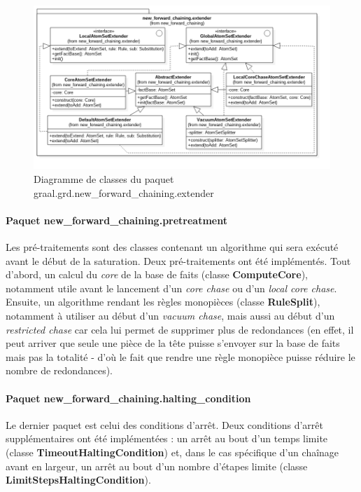        \begin{figure}[h]
        \centering
        \includegraphics[width=\textwidth]{pictures/new_forward_chaining-extender.png}
        \vspace{-30pt}
        \caption{Diagramme de classes du paquet graal.grd.new\_forward\_chaining.extender}
        \label{fig:new_forward_chaining.extender}
        \end{figure}
       
       \paragraph{Paquet new\_forward\_chaining.pretreatment} Les pré-traitements sont des classes contenant un algorithme qui sera exécuté avant le début de la saturation. Deux pré-traitements ont été implémentés. Tout d'abord, un calcul du \textit{core} de la base de faits (classe \textbf{ComputeCore}), notamment utile avant le lancement d'un \textit{core chase} ou d'un \textit{local core chase}. Ensuite, un algorithme rendant les règles monopièces (classe \textbf{RuleSplit}), notamment à utiliser au début d'un \textit{vacuum chase}, mais aussi au début d'un \textit{restricted chase} car cela lui permet de supprimer plus de redondances (en effet, il peut arriver que seule une pièce de la tête puisse s'envoyer sur la base de faits mais pas la totalité - d'où le fait que rendre une règle monopièce puisse réduire le nombre de redondances).
       
       \paragraph{Paquet new\_forward\_chaining.halting\_condition} Le dernier paquet est celui des conditions d'arrêt. Deux conditions d'arrêt supplémentaires ont été implémentées : un arrêt au bout d'un temps limite (classe \textbf{TimeoutHaltingCondition}) et, dans le cas spécifique d'un chaînage avant en largeur, un arrêt au bout d'un nombre d'étapes limite (classe \textbf{LimitStepsHaltingCondition}).
       
